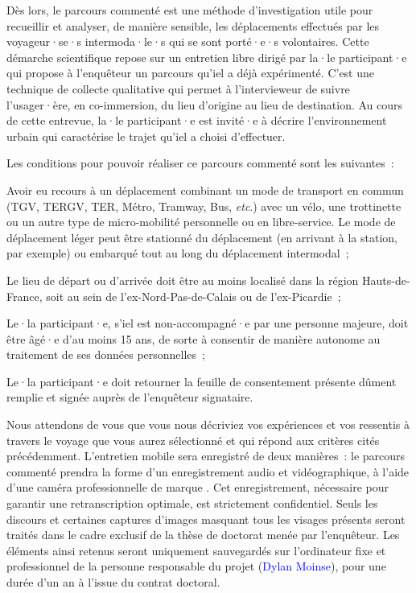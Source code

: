 Dès lors, le parcours commenté est une méthode d’investigation utile pour recueillir et analyser, de manière sensible, les déplacements effectués par les voyageur·se·s intermoda·le·s qui se sont porté·e·s volontaires. Cette démarche scientifique repose sur un entretien libre dirigé par la·le participant·e qui propose à l’enquêteur un parcours qu’iel a déjà expérimenté. C’est une technique de collecte qualitative qui permet à l’intervieweur de suivre l’usager·ère, en co-immersion, du lieu d’origine au lieu de destination. Au cours de cette entrevue, la·le participant·e est invité·e à décrire l’environnement urbain qui caractérise le trajet qu’iel a choisi d’effectuer.%

Les conditions pour pouvoir réaliser ce parcours commenté sont les suivantes~:
\begin{customitemize}
    \item Avoir eu recours à un déplacement combinant un mode de transport en commun (TGV, TERGV, TER, Métro, Tramway, Bus, \textsl{etc}.) avec un vélo, une trottinette ou un autre type de micro-mobilité personnelle ou en libre-service. Le mode de déplacement léger peut être stationné du déplacement (en arrivant à la station, par exemple) ou embarqué tout au long du déplacement intermodal~;
    \item Le lieu de départ ou d’arrivée doit être au moins localisé dans la région Hauts-de-France, soit au sein de l’ex-Nord-Pas-de-Calais ou de l’ex-Picardie~;
    \item Le·la participant·e, s’iel est non-accompagné·e par une personne majeure, doit être âgé·e d’au moins 15 ans, de sorte à consentir de manière autonome au traitement de ses données personnelles~;
    \item Le·la participant·e doit retourner la feuille de consentement présente dûment remplie et signée auprès de l’enquêteur signataire.
\end{customitemize}%

Nous attendons de vous que vous nous décriviez vos expériences et vos ressentis à travers le voyage que vous aurez sélectionné et qui répond aux critères cités précédemment. L’entretien mobile sera enregistré de deux manières~: le parcours commenté prendra la forme d’un enregistrement audio et vidéographique, à l’aide d’une caméra professionnelle de marque . Cet enregistrement, nécessaire pour garantir une retranscription optimale, est strictement confidentiel. Seuls les discours et certaines captures d’images masquant tous les visages présents seront traités dans le cadre exclusif de la thèse de doctorat menée par l’enquêteur. Les éléments ainsi retenus seront uniquement sauvegardés sur l’ordinateur fixe et professionnel de la personne responsable du projet (\textcolor{blue}{Dylan Moinse}), pour une durée d’un an à l’issue du contrat doctoral.%

